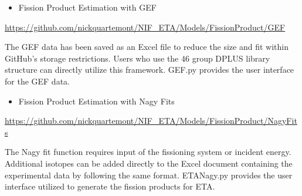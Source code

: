 \begin{itemize}
	\item Fission Product Estimation with GEF  
\end{itemize}

\begin{sloppypar}	
\noindent \url{https://github.com/nickquartemont/NIF_ETA/Models/FissionProduct/GEF}
\end{sloppypar}	

The GEF data has been saved as an Excel file to reduce the size and fit within GitHub's storage restrictions. Users who use the 46 group DPLUS library structure can directly utilize this framework. GEF.py provides the user interface for the GEF data.

\begin{itemize}
	\item Fission Product Estimation with Nagy Fits  
\end{itemize}	

\begin{sloppypar}	
\noindent \url{https://github.com/nickquartemont/NIF_ETA/Models/FissionProduct/NagyFits}
\end{sloppypar}	

The Nagy fit function requires input of the fissioning system or incident energy. Additional isotopes can be added directly to the Excel document containing the experimental data by following the same format. ETA\textunderscore Nagy.py provides the user interface utilized to generate the fission products for ETA. 
	




